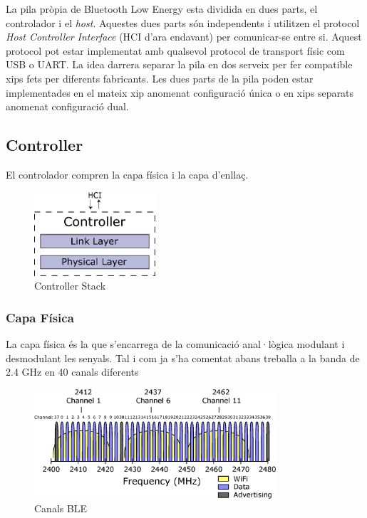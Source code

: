 La pila pròpia de Bluetooth Low Energy esta dividida en dues parts, el controlador i el \textit{host}. Aquestes dues parts són independents i utilitzen el protocol \textit{Host Controller Interface} (HCI d'ara endavant) per comunicar-se entre si.
Aquest protocol pot estar implementat amb qualsevol protocol de transport físic com USB o UART.
La idea darrera separar la pila en dos serveix per fer compatible xips fets per diferents fabricants.
Les dues parts de la pila poden estar implementades en el mateix xip anomenat configuració única o en xips separats anomenat configuració dual.


\subsection{Controller}
El controlador compren la capa física i la capa d'enllaç.

\begin{figure}[h!]
	\begin{center}
		\includegraphics[width=0.4\textwidth]{./diagrames/BLE_Controller}
		\caption{Controller Stack}
	\end{center}
\end{figure}

\subsubsection{Capa Física}
La capa física és la que s'encarrega de la comunicació anal·lògica modulant i desmodulant les senyals.
Tal i com ja s'ha comentat abans treballa a la banda de 2.4 GHz en 40 canals diferents

\begin{figure}[hb]
	\begin{center}
		\includegraphics[width=0.8\textwidth]{./diagrames/BLE_WiFi}
		\caption{Canals BLE}
		\label{BLE_Channels}
	\end{center}
\end{figure}

